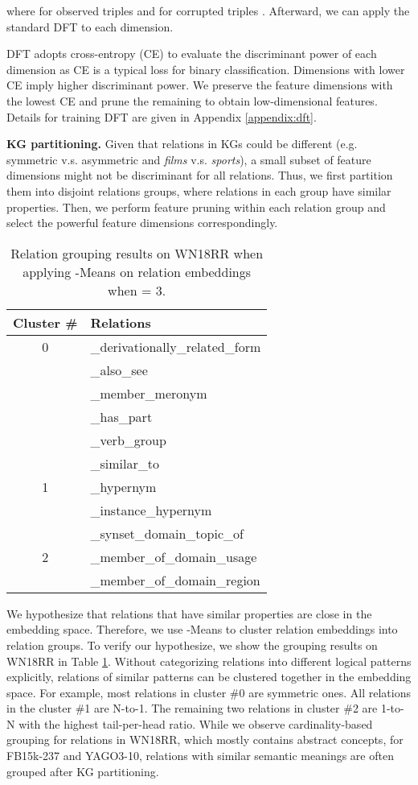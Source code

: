 \documentclass{article}
\begin{document}
where  for observed triples  and  for corrupted triples . 
Afterward, we can apply the standard DFT to each dimension.


DFT adopts cross-entropy (CE) to evaluate the discriminant power of each dimension as
CE is a typical loss for binary classification.  Dimensions
with lower CE imply higher discriminant power. We preserve the 
feature dimensions with the lowest CE and prune the remaining 
to obtain low-dimensional features. Details for training DFT
are given in Appendix \ref{appendix:dft}.




\textbf{KG partitioning.} Given that relations in KGs could be different 
(e.g. symmetric v.s. asymmetric and \emph{films} v.s. \emph{sports}), a small subset of feature dimensions
might not be discriminant for all relations. Thus, we first partition 
them into disjoint relations groups, where relations in each group 
have similar properties. Then, we perform feature pruning within each 
relation group and select the powerful feature dimensions correspondingly.

\begin{table}[t]
\centering
\begin{tabular}{ c l }
\toprule
Cluster \# & Relations \\
\midrule
0 & \_derivationally\_related\_form \\
  & \_also\_see \\
  & \_member\_meronym \\
  & \_has\_part \\
  & \_verb\_group \\
  & \_similar\_to \\
\midrule
1 & \_hypernym \\
  & \_instance\_hypernym \\
  & \_synset\_domain\_topic\_of \\
\midrule
2 & \_member\_of\_domain\_usage \\
  & \_member\_of\_domain\_region \\
\bottomrule
\end{tabular}
\caption{Relation grouping results on WN18RR when applying -Means on 
relation embeddings when  = 3.}
\label{tab:partition}
\end{table}


We hypothesize that relations that have similar properties are close in the 
embedding space. Therefore, we use -Means to cluster relation embeddings
into relation groups. To verify our hypothesize, we show the grouping results on
WN18RR in Table \ref{tab:partition}. Without categorizing relations into 
different logical patterns explicitly, relations of similar patterns can be 
clustered together in the embedding space. For example, most
relations in cluster \#0 are symmetric ones. All relations in the cluster
\#1 are N-to-1. The remaining two relations in cluster \#2 are 1-to-N
with the highest tail-per-head ratio. While we observe cardinality-based
grouping for relations in WN18RR, which mostly contains abstract concepts, 
for FB15k-237 and YAGO3-10, relations with similar semantic 
meanings are often grouped after KG partitioning.
\end{document}
